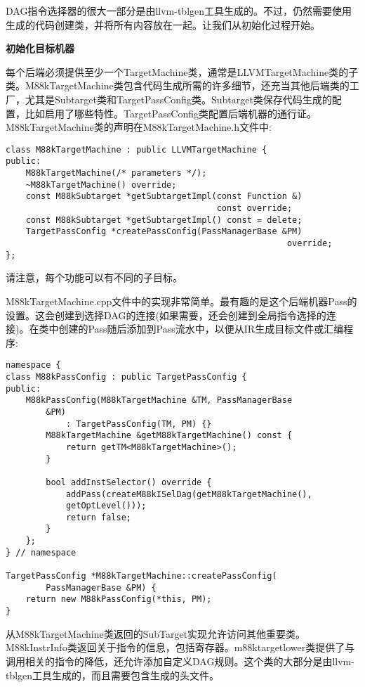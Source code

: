 
DAG指令选择器的很大一部分是由llvm-tblgen工具生成的。不过，仍然需要使用生成的代码创建类，并将所有内容放在一起。让我们从初始化过程开始。\par

\hspace*{\fill} \par %
\textbf{初始化目标机器}

每个后端必须提供至少一个TargetMachine类，通常是LLVMTargetMachine类的子类。M88k\allowbreak TargetMachine类包含代码生成所需的许多细节，还充当其他后端类的工厂，尤其是Subtarget类和TargetPassConfig类。Subtarget类保存代码生成的配置，比如启用了哪些特性。TargetPassConfig类配置后端机器的通行证。M88kTargetMachine类的声明在M88kTargetMachine.h文件中:\par

\begin{lstlisting}[caption={}]
class M88kTargetMachine : public LLVMTargetMachine {
public:
	M88kTargetMachine(/* parameters */);
	~M88kTargetMachine() override;
	const M88kSubtarget *getSubtargetImpl(const Function &)
										  const override;
	const M88kSubtarget *getSubtargetImpl() const = delete;
	TargetPassConfig *createPassConfig(PassManagerBase &PM)
														override;
};
\end{lstlisting}

请注意，每个功能可以有不同的子目标。\par

M88kTargetMachine.cpp文件中的实现非常简单。最有趣的是这个后端机器Pass的设置。这会创建到选择DAG的连接(如果需要，还会创建到全局指令选择的连接)。在类中创建的Pass随后添加到Pass流水中，以便从IR生成目标文件或汇编程序:\par

\begin{lstlisting}[caption={}]
namespace {
class M88kPassConfig : public TargetPassConfig {
public:
	M88kPassConfig(M88kTargetMachine &TM, PassManagerBase
		&PM)
			: TargetPassConfig(TM, PM) {}
		M88kTargetMachine &getM88kTargetMachine() const {
			return getTM<M88kTargetMachine>();
		}
	
		bool addInstSelector() override {
			addPass(createM88kISelDag(getM88kTargetMachine(),
			getOptLevel()));
			return false;
		}
	};
} // namespace

TargetPassConfig *M88kTargetMachine::createPassConfig(
		PassManagerBase &PM) {
	return new M88kPassConfig(*this, PM);
}
\end{lstlisting}

从M88kTargetMachine类返回的SubTarget实现允许访问其他重要类。M88kInstrInfo类返回关于指令的信息，包括寄存器。m88ktargetlower类提供了与调用相关的指令的降低，还允许添加自定义DAG规则。这个类的大部分是由llvm-tblgen工具生成的，而且需要包含生成的头文件。\par

